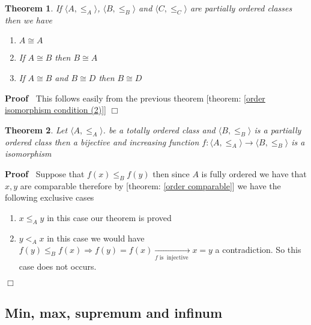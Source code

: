 \documentclass{book}
\newcommand{\Rightarrowlim}{\mathop{\rightarrow}\limits}
\newcommand{\tmop}[1]{\ensuremath{\operatorname{#1}}}
\newenvironment{proof}{\noindent\textbf{Proof\ }}{\hspace*{\fill}$\Box$\medskip}
\newtheorem{theorem}{Theorem}
\begin{document}
\begin{theorem}
  \label{order properties of the isomorph relation}If $\langle A, \leqslant_A
  \rangle$, $\langle B, \leqslant_B \rangle$ and $\langle C, \leqslant_C
  \rangle$ are partially ordered classes then we have
  \begin{enumerate}
    \item $A \cong A$
    
    \item If $A \cong B$ then $B \cong A$
    
    \item If $A \cong B$ and $B \cong D$ then $B \cong D$
  \end{enumerate}
\end{theorem}

\begin{proof}
  This follows easily from the previous theorem [theorem: \ref{order
  isomorphism condition (2)}]
\end{proof}

\begin{theorem}
  \label{order condition for isomorphism in a totallu ordered set}Let $\langle
  A, \leqslant_A \rangle$. be a totally ordered class and $\langle B,
  \leqslant_B \rangle$ is a partially ordered class then a bijective and
  increasing function $f : \langle A, \leqslant_A \rangle \rightarrow \langle
  B, \leqslant_B \rangle$ is a isomorphism
\end{theorem}

\begin{proof}
  Suppose that $f (x) \leqslant_B f (y)$ then since $A$ is fully ordered we
  have that $x, y$ are comparable therefore by [theorem: \ref{order
  comparable}] we have the following exclusive cases
  \begin{enumerate}
    \item $x \leqslant_A y$ in this case our theorem is proved
    
    \item $y <_A x$ in this case we would have $f (y) \leqslant_B f (x)
    \Rightarrow f (y) = f (x) \Rightarrowlim_{f \tmop{is} \tmop{injective}} x
    = y$ a contradiction. So this case does not occurs.
  \end{enumerate}
\end{proof}

\subsection{Min, max, supremum and infinum}
\end{document}
